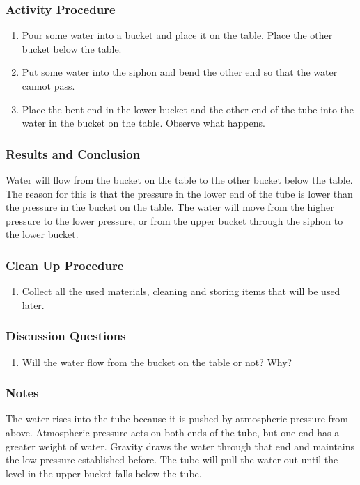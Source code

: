 \subsubsection*{Activity Procedure}
\begin{enumerate}
\item{Pour some water into a bucket and place it on the table. Place the other bucket below the table.} 
\item{Put some water into the siphon and bend the other end so that the water cannot pass.} 
\item{Place the bent end in the lower bucket and the other end of the tube into the water in the bucket on the table. Observe what happens.} 
\end{enumerate}

\subsubsection*{Results and Conclusion}
Water will flow from the bucket on the table to the other bucket below the table. The reason for this is that the pressure in the lower end of the tube is lower than the pressure in the bucket on the table. The water will move from the higher pressure to the lower pressure, or from the upper bucket through the siphon to the lower bucket.  

\subsubsection*{Clean Up Procedure}
\begin{enumerate}
\item{Collect all the used materials, cleaning and storing items that will be used later.} 
\end{enumerate}

\subsubsection*{Discussion Questions}
\begin{enumerate}
\item{Will the water flow from the bucket on the table or not? Why?}
\end{enumerate}

\subsubsection*{Notes}
The water rises into the tube because it is pushed by atmospheric pressure from above. Atmospheric pressure acts on both ends of the tube, but one end has a greater weight of water. Gravity draws the water through that end and maintains the low pressure established before. The tube will pull the water out until the level in the upper bucket falls below the tube.  

